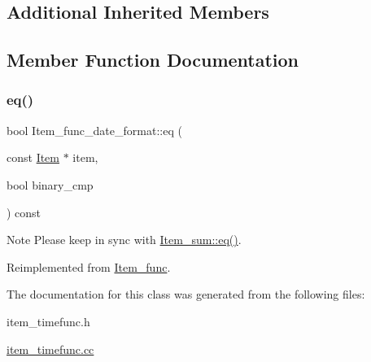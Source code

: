 \subsection*{Additional Inherited Members}


\subsection{Member Function Documentation}
\mbox{\label{classItem__func__date__format_a28846e4dfbb3bb5ea2eeddc387929abe}} 
\subsubsection{\texorpdfstring{eq()}{eq()}}
{\footnotesize\ttfamily bool Item\+\_\+func\+\_\+date\+\_\+format\+::eq (\begin{DoxyParamCaption}\item[{const \mbox{\hyperlink{classItem}{Item}} $\ast$}]{item,  }\item[{bool}]{binary\+\_\+cmp }\end{DoxyParamCaption}) const\hspace{0.3cm}{\ttfamily [virtual]}}

\begin{DoxyNote}{Note}
Please keep in sync with \mbox{\hyperlink{classItem__sum_aeab749252b834e0be4f00aac8ca523f5}{Item\+\_\+sum\+::eq()}}. 
\end{DoxyNote}


Reimplemented from \mbox{\hyperlink{classItem__func_a3de3f23377e6f0006dfccd375086365f}{Item\+\_\+func}}.



The documentation for this class was generated from the following files\+:\begin{DoxyCompactItemize}
\item 
item\+\_\+timefunc.\+h\item 
\mbox{\hyperlink{item__timefunc_8cc}{item\+\_\+timefunc.\+cc}}\end{DoxyCompactItemize}
